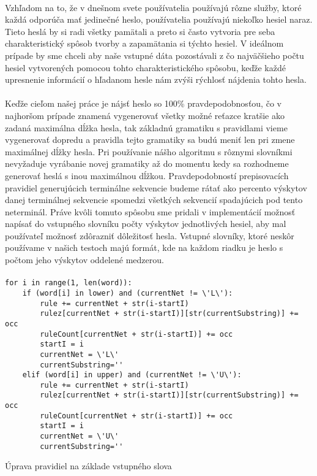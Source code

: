 \paragraph{}
Vzhľadom na to, že v dnešnom svete používatelia používajú rôzne služby, ktoré každá odporúča mať jedinečné heslo, používatelia používajú niekoľko hesiel naraz. Tieto heslá by si radi všetky pamätali a preto si často vytvoria pre seba charakteristický spôsob tvorby a zapamätania si týchto hesiel. V ideálnom prípade by sme chceli aby naše vstupné dáta pozostávali z čo najväčšieho počtu hesiel vytvorených pomocou tohto charakteristického spôsobu, keďže každé upresnenie informácií o hľadanom hesle nám zvýši rýchlosť nájdenia tohto hesla.
\paragraph{}
Keďže cieľom našej práce je nájsť heslo so 100\% pravdepodobnosťou, čo v najhoršom prípade znamená vygenerovať všetky možné reťazce kratšie ako zadaná maximálna dĺžka hesla, tak základnú gramatiku s pravidlami vieme vygenerovať dopredu a pravidla tejto gramatiky sa budú meniť len pri zmene maximálnej dĺžky hesla. Pri používanie nášho algoritmu s rôznymi slovníkmi nevyžaduje vyrábanie novej gramatiky až do momentu kedy sa rozhodneme generovať heslá s inou maximálnou dĺžkou. Pravdepodobností prepisovacích pravidiel generujúcich terminálne sekvencie budeme rátať ako percento výskytov danej terminálnej sekvencie spomedzi všetkých sekvencií spadajúcich pod tento neterminál. Práve kvôli tomuto spôsobu sme pridali v implementácií možnosť napísať do vstupného slovníku počty výskytov jednotlivých hesiel, aby mal používateľ možnosť zdôrazniť dôležitosť hesla. Vstupné slovníky, ktoré neskôr používame v našich testoch majú formát, kde na každom riadku je heslo s počtom jeho výskytov oddelené medzerou. 

\paragraph{}
\begin{listing}
\begin{verbatim}
for i in range(1, len(word)):
	if (word[i] in lower) and (currentNet != \'L\'):
		rule += currentNet + str(i-startI)
		rulez[currentNet + str(i-startI)][str(currentSubstring)] += occ
		ruleCount[currentNet + str(i-startI)] += occ
		startI = i
		currentNet = \'L\'
		currentSubstring=''
	elif (word[i] in upper) and (currentNet != \'U\'):
		rule += currentNet + str(i-startI)
		rulez[currentNet + str(i-startI)][str(currentSubstring)] += occ
		ruleCount[currentNet + str(i-startI)] += occ
		startI = i
		currentNet = \'U\'
		currentSubstring=''
\end{verbatim}
\caption{Úprava pravidiel na základe vstupného slova}
\label{lst:grammar1}
\end{listing}


